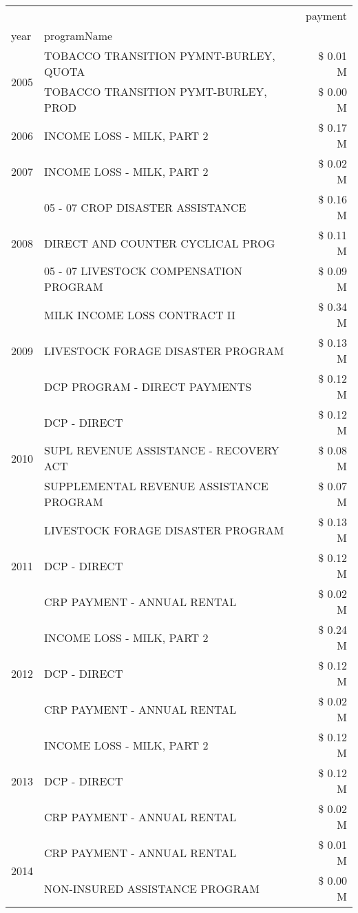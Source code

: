 \begin{tabular}{llr}
\toprule
 &  & payment \\
year & programName &  \\
\midrule
\multirow[t]{2}{*}{2005} & TOBACCO TRANSITION PYMNT-BURLEY, QUOTA & \$ 0.01 M \\
 & TOBACCO TRANSITION PYMT-BURLEY, PROD & \$ 0.00 M \\
\cline{1-3}
2006 & INCOME LOSS - MILK, PART 2 & \$ 0.17 M \\
\cline{1-3}
2007 & INCOME LOSS - MILK, PART 2 & \$ 0.02 M \\
\cline{1-3}
\multirow[t]{3}{*}{2008} & 05 - 07 CROP DISASTER ASSISTANCE & \$ 0.16 M \\
 & DIRECT AND COUNTER CYCLICAL PROG & \$ 0.11 M \\
 & 05 - 07 LIVESTOCK COMPENSATION PROGRAM & \$ 0.09 M \\
\cline{1-3}
\multirow[t]{3}{*}{2009} & MILK INCOME LOSS CONTRACT II & \$ 0.34 M \\
 & LIVESTOCK FORAGE DISASTER  PROGRAM & \$ 0.13 M \\
 & DCP PROGRAM - DIRECT PAYMENTS & \$ 0.12 M \\
\cline{1-3}
\multirow[t]{3}{*}{2010} & DCP - DIRECT & \$ 0.12 M \\
 & SUPL REVENUE ASSISTANCE - RECOVERY ACT & \$ 0.08 M \\
 & SUPPLEMENTAL REVENUE ASSISTANCE PROGRAM & \$ 0.07 M \\
\cline{1-3}
\multirow[t]{3}{*}{2011} & LIVESTOCK FORAGE DISASTER PROGRAM & \$ 0.13 M \\
 & DCP - DIRECT & \$ 0.12 M \\
 & CRP PAYMENT - ANNUAL RENTAL & \$ 0.02 M \\
\cline{1-3}
\multirow[t]{3}{*}{2012} & INCOME LOSS - MILK, PART 2 & \$ 0.24 M \\
 & DCP - DIRECT & \$ 0.12 M \\
 & CRP PAYMENT - ANNUAL RENTAL & \$ 0.02 M \\
\cline{1-3}
\multirow[t]{3}{*}{2013} & INCOME LOSS - MILK, PART 2 & \$ 0.12 M \\
 & DCP - DIRECT & \$ 0.12 M \\
 & CRP PAYMENT - ANNUAL RENTAL & \$ 0.02 M \\
\cline{1-3}
\multirow[t]{2}{*}{2014} & CRP PAYMENT - ANNUAL RENTAL & \$ 0.01 M \\
 & NON-INSURED ASSISTANCE PROGRAM & \$ 0.00 M \\
\cline{1-3}

\end{tabular}

